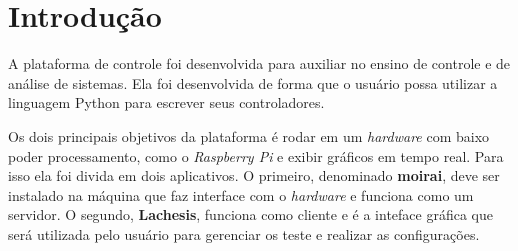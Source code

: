 
\chapter{Introdução}%
\label{chapter:introduction}

A plataforma de controle foi desenvolvida para auxiliar no ensino de controle e
de análise de sistemas. Ela foi desenvolvida de forma que o usuário possa
utilizar a linguagem Python para escrever seus controladores.

Os dois principais objetivos da plataforma é rodar em um \textit{hardware} com
baixo poder processamento, como o \textit{Raspberry Pi} e exibir gráficos em
tempo real. Para isso ela foi divida em dois aplicativos. O primeiro, denominado
\textbf{moirai}, deve ser instalado na máquina que faz interface com o
\textit{hardware} e funciona como um servidor. O segundo, \textbf{Lachesis},
funciona como cliente e é a inteface gráfica que será utilizada pelo usuário
para gerenciar os teste e realizar as configurações.

